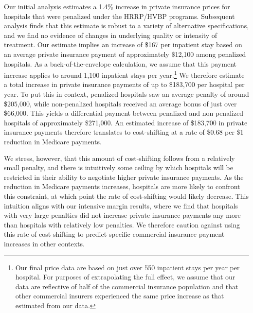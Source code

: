 \documentclass[12pt]{article}
\begin{document}
Our initial analysis estimates a 1.4\% increase in private insurance prices for hospitals that were penalized under the HRRP/HVBP programs. Subsequent analysis finds that this estimate is robust to a variety of alternative specifications, and we find no evidence of changes in underlying quality or intensity of treatment. Our estimate implies an increase of \$167 per inpatient stay based on an average private insurance payment of approximately \$12,100 among penalized hospitals. As a back-of-the-envelope calculation, we assume that this payment increase applies to around 1,100 inpatient stays per year.\footnote{Our final price data are based on just over 550 inpatient stays per year per hospital. For purposes of extrapolating the full effect, we assume that our data are reflective of half of the commercial insurance population and that other commercial insurers experienced the same price increase as that estimated from our data.} We therefore estimate a total increase in private insurance payments of up to \$183,700 per hospital per year. To put this in context, penalized hospitals saw an average penalty of around \$205,000, while non-penalized hospitals received an average bonus of just over \$66,000. This yields a differential payment between penalized and non-penalized hospitals of approximately \$271,000. An estimated increase of \$183,700 in private insurance payments therefore translates to cost-shifting at a rate of \$0.68 per \$1 reduction in Medicare payments.

We stress, however, that this amount of cost-shifting follows from a relatively small penalty, and there is intuitively some ceiling by which hospitals will be restricted in their ability to negotiate higher private insurance payments. As the reduction in Medicare payments increases, hospitals are more likely to confront this constraint, at which point the rate of cost-shifting would likely decrease. This intuition aligns with our intensive margin results, where we find that hospitals with very large penalties did not increase private insurance payments any more than hospitals with relatively low penalties. We therefore caution against using this rate of cost-shifting to predict specific commercial insurance payment increases in other contexts.
\end{document}
